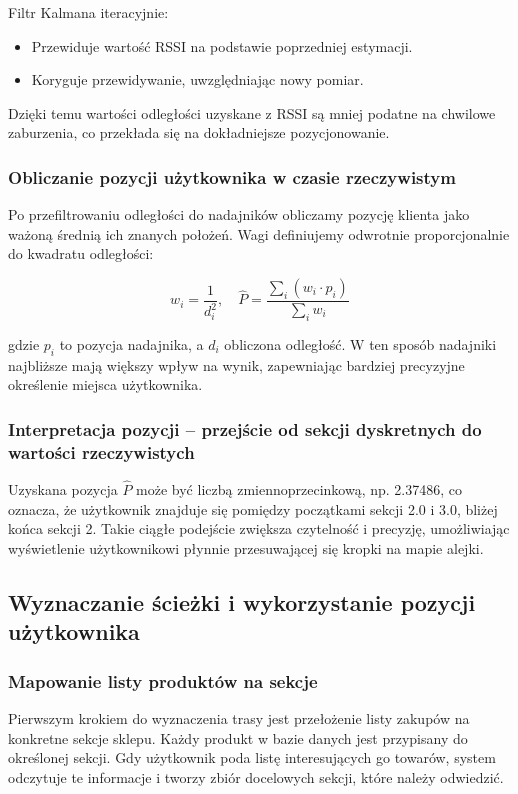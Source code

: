 Filtr Kalmana iteracyjnie:
\begin{itemize}
    \item Przewiduje wartość RSSI na podstawie poprzedniej estymacji.
    \item Koryguje przewidywanie, uwzględniając nowy pomiar.
\end{itemize}

Dzięki temu wartości odległości uzyskane z RSSI są mniej podatne na chwilowe zaburzenia, co przekłada się na dokładniejsze pozycjonowanie.

\subsubsection{Obliczanie pozycji użytkownika w czasie rzeczywistym}
Po przefiltrowaniu odległości do nadajników obliczamy pozycję klienta jako ważoną średnią ich znanych położeń. Wagi definiujemy odwrotnie proporcjonalnie do kwadratu odległości:

\[
w_i = \frac{1}{d_i^2}, \quad \hat{P} = \frac{\sum_i (w_i \cdot p_i)}{\sum_i w_i}
\]

gdzie \( p_i \) to pozycja nadajnika, a \( d_i \) obliczona odległość. W ten sposób nadajniki najbliższe mają większy wpływ na wynik, zapewniając bardziej precyzyjne określenie miejsca użytkownika.

\subsubsection{Interpretacja pozycji – przejście od sekcji dyskretnych do wartości rzeczywistych}
Uzyskana pozycja \(\hat{P}\) może być liczbą zmiennoprzecinkową, np. 2.37486, co oznacza, że użytkownik znajduje się pomiędzy początkami sekcji 2.0 i 3.0, bliżej końca sekcji 2. Takie ciągłe podejście zwiększa czytelność i precyzję, umożliwiając wyświetlenie użytkownikowi płynnie przesuwającej się kropki na mapie alejki.

\subsection{Wyznaczanie ścieżki i wykorzystanie pozycji użytkownika}

\subsubsection{Mapowanie listy produktów na sekcje}
Pierwszym krokiem do wyznaczenia trasy jest przełożenie listy zakupów na konkretne sekcje sklepu. Każdy produkt w bazie danych jest przypisany do określonej sekcji. Gdy użytkownik poda listę interesujących go towarów, system odczytuje te informacje i tworzy zbiór docelowych sekcji, które należy odwiedzić.

